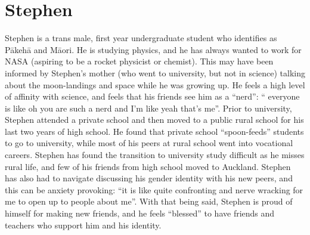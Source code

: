  

\section{Stephen}
Stephen is a trans male, first year undergraduate student who identifies as P\={a}keh\={a} and M\={a}ori. He is studying physics, and he has always wanted to work for NASA (aspiring to be a rocket physicist or chemist). This may have been informed by Stephen's mother (who went to university, but not in science) talking about the moon-landings and space while he was growing up. He feels a high level of affinity with science, and feels that his friends see him as a ``nerd'': `` everyone is like oh you are such a nerd and I’m like yeah that's me''. Prior to university, Stephen attended a private school and then moved to a public rural school for his last two years of high school. He found that private school ``spoon-feeds'' students to go to university, while most of his peers at rural school went into vocational careers. Stephen has found the transition to university study difficult as he misses rural life, and few of his friends from high school moved to Auckland. Stephen has also had to navigate discussing his gender identity with his new peers, and this can be anxiety provoking: ``it is like quite confronting and nerve wracking for me to open up to people about me''. With that being said, Stephen is proud of himself for making new friends, and he feels ``blessed'' to have friends and teachers who support him and his identity.  

